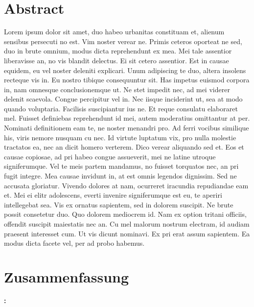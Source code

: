 
\chapter*{Abstract}
\thispagestyle{empty}

\noindent Lorem ipsum dolor sit amet, duo habeo urbanitas constituam et, alienum sensibus persecuti no est. Vim noster verear ne. Primis ceteros oporteat ne sed, duo in brute omnium, modus dicta reprehendunt ex mea. Mei tale assentior liberavisse an, no vis blandit delectus. Ei sit cetero assentior. Est in causae equidem, eu vel noster deleniti explicari. Unum adipiscing te duo, altera insolens recteque vis in. Eu nostro tibique consequuntur sit. Has impetus euismod corpora in, nam omnesque conclusionemque ut. Ne stet impedit nec, ad mei viderer delenit scaevola. Congue percipitur vel in. Nec iisque inciderint ut, sea at modo quando voluptaria. Facilisis suscipiantur ius ne. Et reque consulatu elaboraret mel. Fuisset definiebas reprehendunt id mei, autem moderatius omittantur at per. Nominati definitionem eam te, ne noster menandri pro. Ad ferri vocibus similique his, viris nemore nusquam cu nec. Id virtute luptatum vix, pro nulla molestie tractatos ea, nec an dicit homero verterem. Dico verear aliquando sed et. Eos et causae copiosae, ad pri habeo congue assueverit, mei ne latine utroque signiferumque. Vel te meis partem mandamus, no fuisset torquatos nec, an pri fugit integre. Mea causae invidunt in, at est omnis legendos dignissim. Sed ne accusata gloriatur. Vivendo dolores at nam, ocurreret iracundia repudiandae eam et. Mei ei elitr adolescens, everti invenire signiferumque est eu, te aperiri intellegebat sea. Vis ex ornatus sapientem, sed in dolorem suscipit. Ne brute possit consetetur duo. Quo dolorem mediocrem id. Nam ex option tritani officiis, offendit suscipit maiestatis nec an. Cu mel malorum nostrum electram, id audiam praesent interesset cum. Ut vis dicunt nominavi. Ex pri erat assum sapientem. Ea modus dicta facete vel, per ad probo habemus.

\addBlank

\chapter*{Zusammenfassung}
\thispagestyle{empty}
\noindent \textbf{\thesisTitleDe:}\par
\vspace{\baselineskip}

